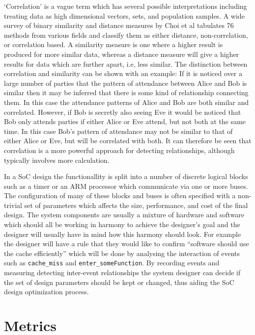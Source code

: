 \documentclass[runningheads]{llncs}
\begin{document}
`Correlation' is a vague term which has several possible
interpretations\cite{RodgersNicewander1988} including treating
data as high dimensional vectors, sets, and population samples.
A wide survey of binary similarity and distance measures by
Choi et al\cite{ChoiEtAl2010}
tabulates 76 methods from various fields and classify them as either distance,
non-correlation, or correlation based.
A similarity measure is one where a higher result is produced for more similar
data, whereas a distance measure will give a higher results for data which are
further apart, i.e, less similar.
The distinction between correlation and similarity can be shown with an example:
If it is noticed over a large number of parties that the pattern of attendance
between Alice and Bob is similar then it may be inferred that there is some kind
of relationship connecting them.
In this case the attendance patterns of Alice and Bob are both similar and
correlated.
However, if Bob is secretly also seeing Eve it would be noticed that Bob only
attends parties if either Alice or Eve attend, but not both at the same time.
In this case Bob's pattern of attendance may not be similar to that of either
Alice or Eve, but will be correlated with both.
It can therefore be seen that correlation is a more powerful approach for
detecting relationships, although typically involves more calculation.

In a \gls{SoC} design the functionallity is split into a number of discrete
logical blocks such as a timer or an ARM processor which communicate via one
or more buses.
The configuration of many of these blocks and buses is often specified with a
non-trivial set of parameters which affects the size, performance, and cost of
the final design.
The system components are usually a mixture of hardware and software which
should all be working in harmony to achieve the designer's goal and the designer
will usually have in mind how this harmony should look.
For example the designer will have a rule that they would like to confirm
``software should use the cache efficiently'' which will be done by analysing
the interaction of events such as \texttt{cache\_miss} and
\texttt{enter\_someFunction}.
By recording events and measuring detecting inter-event relationships the system
designer can decide if the set of design parameters should be kept or
changed\cite{McEwanPRIME2019}, thus aiding the \gls{SoC} design optimization process.



\section{Metrics} %
\label{sec:metrics}
\end{document}
